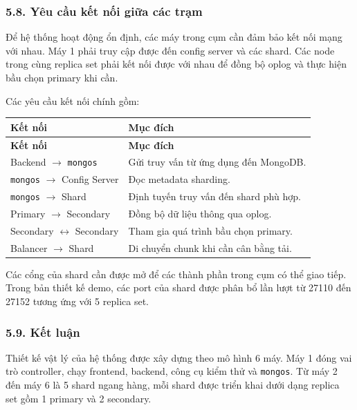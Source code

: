 \documentclass[12pt,a4paper]{article}
\begin{document}
\subsubsection*{5.8. Yêu cầu kết nối giữa các trạm}

Để hệ thống hoạt động ổn định, các máy trong cụm cần đảm bảo kết nối mạng với nhau. Máy 1 phải truy cập được đến config server và các shard. Các node trong cùng replica set phải kết nối được với nhau để đồng bộ oplog và thực hiện bầu chọn primary khi cần.

Các yêu cầu kết nối chính gồm:

\begin{center}
\small
\begin{longtable}{|p{3.5cm}|p{8.5cm}|}
\hline
\textbf{Kết nối} & \textbf{Mục đích} \\ \hline
\endfirsthead
\hline
\textbf{Kết nối} & \textbf{Mục đích} \\ \hline
\endhead
Backend $\rightarrow$ \texttt{mongos} & Gửi truy vấn từ ứng dụng đến MongoDB. \\ \hline
\texttt{mongos} $\rightarrow$ Config Server & Đọc metadata sharding. \\ \hline
\texttt{mongos} $\rightarrow$ Shard & Định tuyến truy vấn đến shard phù hợp. \\ \hline
Primary $\rightarrow$ Secondary & Đồng bộ dữ liệu thông qua oplog. \\ \hline
Secondary $\leftrightarrow$ Secondary & Tham gia quá trình bầu chọn primary. \\ \hline
Balancer $\rightarrow$ Shard & Di chuyển chunk khi cần cân bằng tải. \\ \hline
\end{longtable}
\normalsize
\end{center}

Các cổng của shard cần được mở để các thành phần trong cụm có thể giao tiếp. Trong bản thiết kế demo, các port của shard được phân bổ lần lượt từ 27110 đến 27152 tương ứng với 5 replica set.

\subsubsection*{5.9. Kết luận}

Thiết kế vật lý của hệ thống được xây dựng theo mô hình 6 máy. Máy 1 đóng vai trò controller, chạy frontend, backend, công cụ kiểm thử và \texttt{mongos}. Từ máy 2 đến máy 6 là 5 shard ngang hàng, mỗi shard được triển khai dưới dạng replica set gồm 1 primary và 2 secondary.
\end{document}
